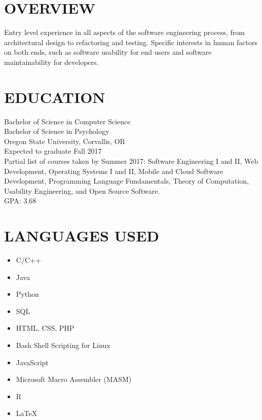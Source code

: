 \documentclass[line, margin]{res}
\begin{document}
\address{636 NW 10th St\\ Corvallis, OR 97330\\ (541) 740-6700\\ hoffera@oregonstate.edu}

\begin{resume}
\section{OVERVIEW}
Entry level experience in all aspects of the software engineering process, from architectural design to refactoring and testing. Specific interests in human factors on both ends, such as software usability for end users and software maintainability for developers.

\section{EDUCATION}
Bachelor of Science in Computer Science \\
Bachelor of Science in Psychology \\
Oregon State University, Corvallis, OR \\
Expected to graduate Fall 2017 \\
Partial list of courses taken by Summer 2017: Software Engineering I and II, Web Development, Operating Systems I and II, Mobile and Cloud Software Development, Programming Language Fundamentals, Theory of Computation, Usability Engineering, and Open Source Software. \\
GPA: 3.68

\section{LANGUAGES USED}
\begin{itemize}
\small
\item C/C++
\item Java
\item Python
\item SQL
\item HTML, CSS, PHP
\item Bash Shell Scripting for Linux
\item JavaScript
\item Microsoft Macro Assembler (MASM)
\item R
\item LaTeX
\end{itemize}


\end{resume}
\end{document}
